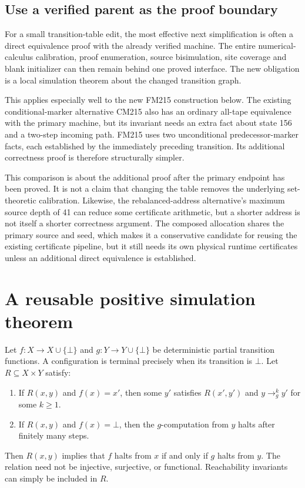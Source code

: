 \subsection{Use a verified parent as the proof boundary}

For a small transition-table edit, the most effective next simplification
is often a direct equivalence proof with the already verified machine.
The entire numerical-calculus calibration, proof enumeration, source
bisimulation, site coverage and blank initializer can then remain behind
one proved interface. The new obligation is a local simulation theorem
about the changed transition graph.

This applies especially well to the new FM215 construction below. The
existing conditional-marker alternative CM215 also has an ordinary
all-tape equivalence with the primary machine, but its invariant needs
an extra fact about state 156 and a two-step incoming path. FM215 uses two
unconditional predecessor-marker facts, each established by the
immediately preceding transition. Its additional correctness proof is
therefore structurally simpler.

This comparison is about the additional proof after the primary endpoint
has been proved. It is not a claim that changing the table removes the
underlying set-theoretic calibration. Likewise, the rebalanced-address
alternative's maximum source depth of 41 can reduce some certificate
arithmetic, but a shorter address is not itself a shorter correctness
argument. The composed allocation shares the primary source and seed,
which makes it a conservative candidate for reusing the existing
certificate pipeline, but it still needs its own physical runtime
certificates unless an additional direct equivalence is established.

\section{A reusable positive simulation theorem}
\label{sec:positive-simulation}

Let $f:X\to X\cup\{\bot\}$ and $g:Y\to Y\cup\{\bot\}$ be deterministic
partial transition functions. A configuration is terminal precisely when
its transition is $\bot$. Let $R\subseteq X\times Y$ satisfy:
\begin{enumerate}
\item If $R(x,y)$ and $f(x)=x'$, then some $y'$ satisfies $R(x',y')$
  and $y\mathrel{\longrightarrow_g^{k}}y'$ for some $k\geq1$.
\item If $R(x,y)$ and $f(x)=\bot$, then the $g$-computation from $y$
  halts after finitely many steps.
\end{enumerate}
Then $R(x,y)$ implies that $f$ halts from $x$ if and only if $g$ halts
from $y$. The relation need not be injective, surjective, or functional.
Reachability invariants can simply be included in $R$.


